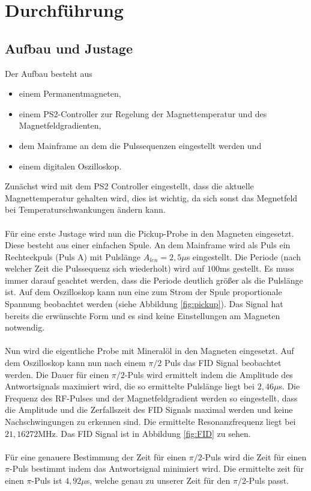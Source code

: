 \section{Durchführung}
\subsection{Aufbau und Justage}
Der Aufbau besteht aus 

\begin{itemize}
  \item einem Permanentmagneten,
    \item einem PS2-Controller zur Regelung der Magnettemperatur und des Magnetfeldgradienten,
      \item dem Mainframe an dem die Pulssequenzen eingestellt werden und
        \item einem digitalen Oszilloskop.
\end{itemize}

Zunächst wird mit dem PS2 Controller eingestellt, dass die aktuelle Magnettemperatur gehalten wird, dies ist wichtig, da sich sonst das Megnetfeld bei Temperaturschwankungen ändern kann. \\ \\
Für eine erste Justage wird nun die Pickup-Probe in den Magneten eingesetzt. Diese besteht aus einer einfachen Spule. An dem Mainframe wird als Puls ein Rechteckpuls (Puls A) mit Pulslänge $A_{len}=2,5\mu$s eingestellt. Die Periode (nach welcher Zeit die Pulssequenz sich wiederholt) wird auf $100$ms gestellt. Es muss immer darauf geachtet werden, dass die Periode deutlich größer als die Pulslänge ist. Auf dem Oszilloskop kann nun eine zum Strom der Spule proportionale Spannung beobachtet werden (siehe Abbildung \ref{fig:pickup}). Das Signal hat bereits die erwünschte Form und es sind keine Einstellungen am Magneten notwendig.\\ \\
Nun wird die eigentliche Probe mit Mineralöl in den Magneten eingesetzt. Auf dem Oszilloskop kann nun nach einem $\pi/2$ Puls das FID Signal beobachtet werden. Die Dauer für einen $\pi/2$-Puls wird ermittelt indem die Amplitude des Antwortsignals maximiert wird, die so ermittelte Pulslänge liegt bei $2,46 \mu$s. Die Frequenz des RF-Pulses und der Magnetfeldgradient werden so eingestellt, dass die Amplitude und die Zerfallszeit des FID Signals maximal werden und keine Nachschwingungen zu erkennen sind. Die ermittelte Resonanzfrequenz liegt bei $21,16272$MHz. Das FID Signal ist in Abbildung \ref{fig:FID} zu sehen. \\ \\
Für eine genauere Bestimmung der Zeit für einen $\pi/2$-Puls wird die Zeit für einen $\pi$-Puls bestimmt indem das Antwortsignal minimiert wird. Die ermittelte zeit für einen $\pi$-Puls ist $4,92\mu$s, welche genau zu unserer Zeit für den $\pi/2$-Puls passt.

